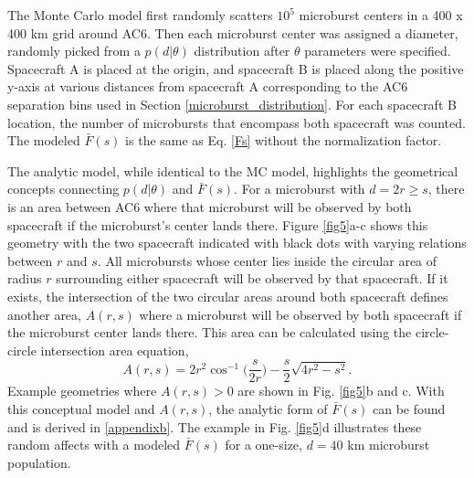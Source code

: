 \documentclass[draft]{agujournal2019}
\begin{document}
The Monte Carlo model first randomly scatters $10^5$ microburst centers in a 400 x 400 km grid around AC6. Then each microburst center was assigned a diameter, randomly picked from a $p(d | \theta)$ distribution after $\theta$ parameters were specified. Spacecraft A is placed at the origin, and spacecraft B is placed along the positive y-axis at various distances from spacecraft A corresponding to the AC6 separation bins used in Section \ref{microburst_distribution}. For each spacecraft B location, the number of microbursts that encompass both spacecraft was counted. The modeled $\bar{F}(s)$ is the same as Eq. \ref{Fs} without the normalization factor.

The analytic model, while identical to the MC model, highlights the geometrical concepts connecting $p(d | \theta)$ and $\bar{F}(s)$. For a microburst with $d = 2r \geq s$, there is an area between AC6 where that microburst will be observed by both spacecraft if the microburst's center lands there. Figure \ref{fig5}a-c shows this geometry with the two spacecraft indicated with black dots with varying relations between $r$ and $s$. All microbursts whose center lies inside the circular area of radius $r$ surrounding either spacecraft will be observed by that spacecraft. If it exists, the intersection of the two circular areas around both spacecraft defines another area, $A(r, s)$ where a microburst will be observed by both spacecraft if the microburst center lands there. This area can be calculated using the circle-circle intersection area equation, 
\begin{equation} \label{circle_circle_intersect}
A(r, s) = 2r^2 \cos^{-1}{\Big( \frac{s}{2r} \Big)} - \frac{s}{2} \sqrt{4r^2 - s^2}.
\end{equation} Example geometries where $A(r, s) > 0$ are shown in Fig. \ref{fig5}b and c. With this conceptual model and $A(r, s)$, the analytic form of $\bar{F}(s)$ can be found and is derived in \ref{appendixb}. The example in Fig. \ref{fig5}d illustrates these random affects with a modeled $\bar{F}(s)$ for a one-size, $d=40$ km microburst population.

\end{document}
